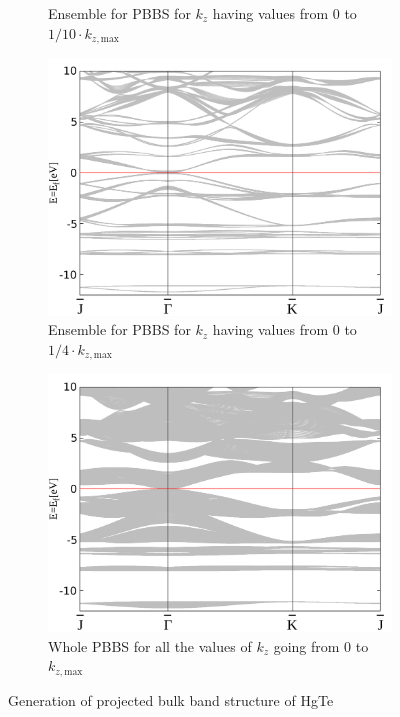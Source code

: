\begin{figure}[htbp]
\begin{subfigure}[c]{.48\linewidth}
			\caption{Ensemble for PBBS for $k_z$ having values from 0 to $1/10\cdot k_{z,\text{max}}$}
		\end{subfigure}
		\begin{subfigure}[c]{.48\linewidth}
			\centering
			\includegraphics[width=\linewidth]{andere_bilder/10_bulk_-12_10.pdf}
			\caption{Ensemble for PBBS for $k_z$ having values from 0 to $1/4\cdot k_{z,\text{max}}$} 
		\end{subfigure}
		\hfill
		\begin{subfigure}[c]{.48\linewidth}
			\centering 
			\includegraphics[width=\linewidth]{andere_bilder/bulk_-12_10.pdf}
			\caption{Whole PBBS for all the values of $k_z$ going from 0 to $k_{z,\text{max}}$} \label{bulk_PBBS}
		\end{subfigure}
		\caption{Generation of projected bulk band structure of HgTe} \label{bulk_band_structure_generation}
	\end{figure}

